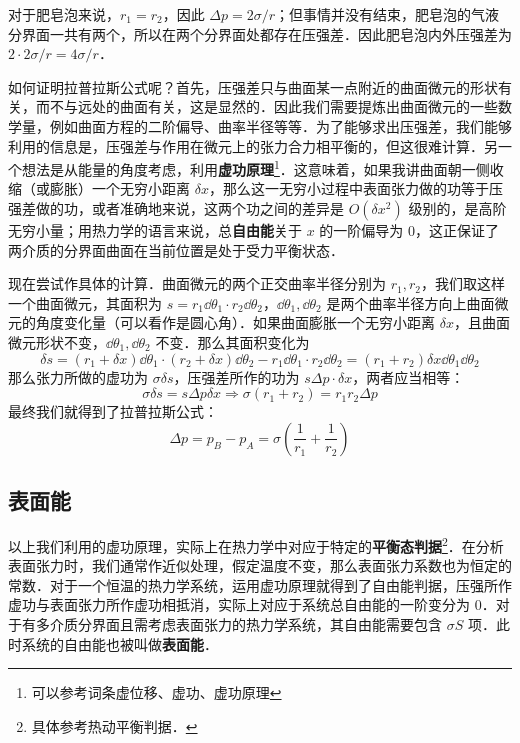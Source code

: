 对于肥皂泡来说，$r_1=r_2$，因此 $\Delta p=2\sigma/r$；但事情并没有结束，肥皂泡的气液分界面一共有两个，所以在两个分界面处都存在压强差．因此肥皂泡内外压强差为 $2\cdot 2\sigma/r=4\sigma/r$．

如何证明拉普拉斯公式呢？首先，压强差只与曲面某一点附近的曲面微元的形状有关，而不与远处的曲面有关，这是显然的．因此我们需要提炼出曲面微元的一些数学量，例如曲面方程的二阶偏导、曲率半径等等．为了能够求出压强差，我们能够利用的信息是，压强差与作用在微元上的张力合力相平衡的，但这很难计算．另一个想法是从能量的角度考虑，利用\textbf{虚功原理}\footnote{可以参考词条虚位移、虚功、虚功原理}．这意味着，如果我讲曲面朝一侧收缩（或膨胀）一个无穷小距离 $\delta x$，那么这一无穷小过程中表面张力做的功等于压强差做的功，或者准确地来说，这两个功之间的差异是 $O(\delta x^2)$ 级别的，是高阶无穷小量；用热力学的语言来说，总\textbf{自由能}关于 $x$ 的一阶偏导为 $0$，这正保证了两介质的分界面曲面在当前位置是处于受力平衡状态．

现在尝试作具体的计算．曲面微元的两个正交曲率半径分别为 $r_1,r_2$，我们取这样一个曲面微元，其面积为 $s=r_1 \dd \theta_1 \cdot r_2 \dd \theta_2$，$\dd\theta_1,\dd\theta_2$ 是两个曲率半径方向上曲面微元的角度变化量（可以看作是圆心角）．如果曲面膨胀一个无穷小距离 $\delta x$，且曲面微元形状不变，$\dd \theta_1,\dd \theta_2$ 不变．那么其面积变化为
\begin{equation}
\delta s=(r_1+\delta x)\dd \theta_1\cdot 
(r_2+\delta x)\dd \theta_2 - r_1 \dd \theta_1 \cdot r_2 \dd \theta_2=(r_1+r_2)\delta x \dd \theta_1\dd \theta_2
\end{equation}
那么张力所做的虚功为 $\sigma \delta s$，压强差所作的功为 $s\Delta p \cdot \delta x$，两者应当相等：
\begin{equation}
\sigma\delta s=s\Delta p \delta x\Rightarrow \sigma(r_1+r_2)=r_1r_2\Delta p
\end{equation}
最终我们就得到了拉普拉斯公式：
\begin{equation}
\Delta p=p_B-p_A=\sigma(\frac{1}{r_1}+\frac{1}{r_2})
\end{equation}


\subsection{表面能}
以上我们利用的虚功原理，实际上在热力学中对应于特定的\textbf{平衡态判据}\footnote{具体参考热动平衡判据．}．在分析表面张力时，我们通常作近似处理，假定温度不变，那么表面张力系数也为恒定的常数．对于一个恒温的热力学系统，运用虚功原理就得到了自由能判据，压强所作虚功与表面张力所作虚功相抵消，实际上对应于系统总自由能的一阶变分为 $0$．对于有多介质分界面且需考虑表面张力的热力学系统，其自由能需要包含 $\sigma S$ 项．此时系统的自由能也被叫做\textbf{表面能}．

